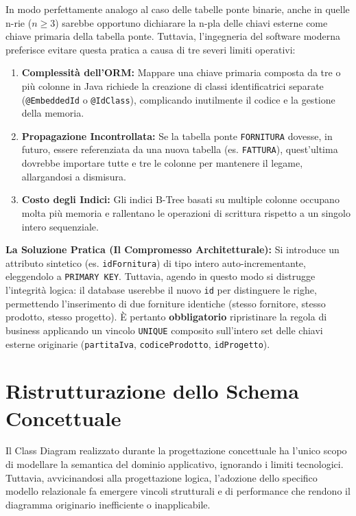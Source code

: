 \begin{tip}
In modo perfettamente analogo al caso delle tabelle ponte binarie, anche in quelle n-rie ($n \ge 3$) sarebbe opportuno dichiarare la n-pla delle chiavi esterne come chiave primaria della tabella ponte. Tuttavia,  l'ingegneria del software moderna preferisce evitare questa pratica a causa di tre severi limiti operativi:
\begin{enumerate}
    \item \textbf{Complessità dell'ORM:} Mappare una chiave primaria composta da tre o più colonne in Java richiede la creazione di classi identificatrici separate (\texttt{@EmbeddedId} o \texttt{@IdClass}), complicando inutilmente il codice e la gestione della memoria.
    \item \textbf{Propagazione Incontrollata:} Se la tabella ponte \texttt{FORNITURA} dovesse, in futuro, essere referenziata da una nuova tabella (es. \texttt{FATTURA}), quest'ultima dovrebbe importare tutte e tre le colonne per mantenere il legame, allargandosi a dismisura.
    \item \textbf{Costo degli Indici:} Gli indici B-Tree basati su multiple colonne occupano molta più memoria e rallentano le operazioni di scrittura rispetto a un singolo intero sequenziale.
\end{enumerate}

\textbf{La Soluzione Pratica (Il Compromesso Architetturale):}
Si introduce un attributo sintetico (es. \texttt{idFornitura}) di tipo intero auto-incrementante, eleggendolo a \texttt{PRIMARY KEY}. 
Tuttavia, agendo in questo modo si distrugge l'integrità logica: il database userebbe il nuovo \texttt{id} per distinguere le righe, permettendo l'inserimento di due forniture identiche (stesso fornitore, stesso prodotto, stesso progetto).
È pertanto \textbf{obbligatorio} ripristinare la regola di business applicando un vincolo \texttt{UNIQUE} composito sull'intero set delle chiavi esterne originarie (\texttt{partitaIva}, \texttt{codiceProdotto}, \texttt{idProgetto}).
\end{tip}

\section{Ristrutturazione dello Schema Concettuale}

Il Class Diagram realizzato durante la progettazione concettuale ha l'unico scopo di modellare la semantica del dominio applicativo, ignorando i limiti tecnologici. Tuttavia, avvicinandosi alla progettazione logica, l'adozione dello specifico modello relazionale fa emergere vincoli strutturali e di performance che rendono il diagramma originario inefficiente o inapplicabile. 

